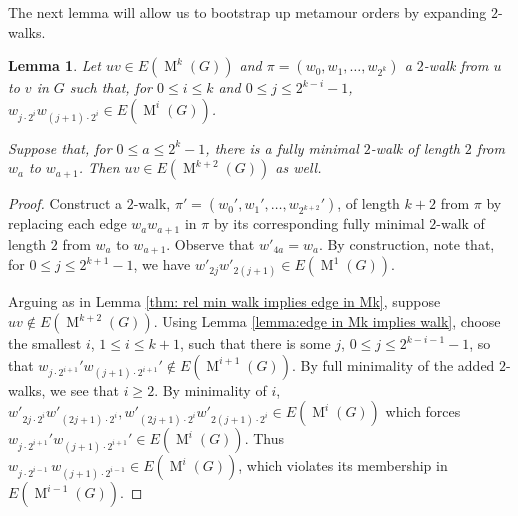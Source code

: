 \documentclass[12pt]{amsart}
\newtheorem{lemma}[theorem]{Lemma}
\theoremstyle{definition}
\theoremstyle{remark}
\numberwithin{equation}{section}
\numberwithin{figure}{section}
\newcommand{\M}{\operatorname{M}}
\begin{document}
The next lemma will allow us to bootstrap up metamour orders by expanding $2$-walks.
\begin{lemma}  \label{Expansion of 2-walks}
    Let $uv \in E(\M^k(G))$ and $\pi =( w_0,w_1,\dots,w_{2^k})$ a $2$-walk from $u$ to $v$ in $G$ such that, for $0 \leq i \leq k$ and $0 \leq j \leq 2^{k-i} - 1$, $w_{j\cdot2^i}w_{(j+1)\cdot2^i} \in E(\M^{i}(G))$. 
    
    Suppose that, for $0 \leq a \leq 2^k - 1$, there is a fully minimal $2$-walk of length $2$ from $w_a$ to $w_{a+1}$. Then $uv \in E(\M^{k+2}(G))$ as well.
\end{lemma}

\begin{proof}
    Construct a $2$-walk, $\pi' = (w_0',w_1',\dots,w_{2^{k+2}}')$, of length $k+2$ from $\pi$ by replacing each edge $w_a w_{a+1}$ in $\pi$ by its corresponding fully minimal $2$-walk of length $2$ from $w_a$ to $w_{a+1}$. Observe that $w'_{4a} = w_a$. By construction, note that, for $0 \leq j \leq 2^{k+1}-1$, we have $w'_{2j}w'_{2(j+1)} \in E(\M^1(G))$.
    
    Arguing as in Lemma \ref{thm: rel min walk implies edge in Mk}, suppose $uv \not\in E(\M^{k+2}(G))$. Using Lemma \ref{lemma:edge in Mk implies walk}, choose the smallest $i$, $1 \leq i \leq k+1$, such that there is some $j$, $0 \leq j \leq 2^{k-i-1} - 1$, so that $w_{j\cdot 2^{i+1}}' w_{(j+1)\cdot2^{i+1}}' \notin E(\M^{i+1}(G))$. By full minimality of the added $2$-walks, we see that $i\geq 2$.
    By minimality of $i$, $w'_{2j\cdot2^i}w'_{(2j+1)\cdot2^i},w'_{(2j+1)\cdot2^i}w'_{2(j+1)\cdot2^i} \in E(\M^i(G))$
    which forces $w_{j\cdot 2^{i+1}}' w_{(j+1)\cdot2^{i+1}}' \in E(\M^i(G))$. Thus 
    $w_{j\cdot2^{i-1}} \, w_{(j+1)\cdot2^{i-1}} \in E(\M^i(G))$, which violates its membership in $E(\M^{i-1}(G))$.
\end{proof}
\end{document}
